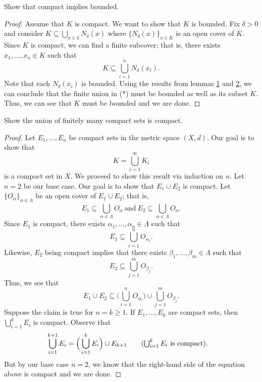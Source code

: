 \documentclass[a4paper]{article}
\begin{document}
   \begin{problem}
       Show that compact implies bounded.
   \end{problem}
   \begin{proof}
       Assume that \( K  \) is compact. We want to show that \( K  \) is bounded. Fix \( \delta > 0  \) and consider \( K \subseteq \bigcup_{ x \in k  }^{  } {N}_{\delta}(x) \) where \( \{ {N}_{\delta}(x) \}_{x \in K} \) is an open cover of \( K  \). Since \( K  \) is compact, we can find a finite subcover; that is, there exists \( {x}_{1}, \dots, {x}_{n} \in K     \) such that 
       \[ K \subseteq \bigcup_{ i=1  }^{ n } {N}_{\delta}({x}_{i}). \tag{*}  \]
       Note that each \( {N}_{\delta}({x}_{i}) \) is bounded. Using the results from lemmas {\hyperref[lemma 1]{1}} and {\hyperref[lemma 2]{2}}, we can conclude that the finite union in (*) must be bounded as well as its subset \( K  \). Thus, we can see that \( K  \) must be bounded and we are done.   
   \end{proof}



   \begin{problem}
      Show the union of finitely many compact sets is compact. 
   \end{problem}
\begin{proof}
    Let \( {E}_{1}, \dots, {E}_{n} \) be compact sets in the metric space \( (X,d) \). Our goal is to show that  
    \[  K = \bigcup_{ i=1  }^{ \infty   }  {K}_{i}  \]
    is a compact set in \( X \). We proceed to show this result via induction on \( n  \).
    Let \( n = 2  \) be our base case. Our goal is to show that \( {E}_{1} \cup {E}_{2} \) is compact. Let \( \{ {O}_{\alpha} \}_{\alpha \in \Lambda} \) be an open cover of \( {E}_{1} \cup {E}_{2} \); that is,
    \[  {E}_{1} \subseteq  \bigcup_{ \alpha \in \Lambda }^{  }  {O}_{\alpha} \ \text{and} \ {E}_{2} \subseteq  \bigcup_{ \alpha \in \Lambda }^{  }  {O}_{\alpha}. \]
    Since \( {E}_{1} \) is compact, there exists \( {\alpha}_{1}, \dots, {\alpha}_{n} \in \Lambda  \) such that 
    \[  {E}_{1} \subseteq  \bigcup_{ i=1  }^{ n }  {O}_{{\alpha}_{i}}. \]
    Likewise, \( {E}_{2} \) being compact implies that there exists \( {\beta}_{1}, \dots, {\beta}_{m} \in \Lambda \) such that  
    \[  {E}_{2} \subseteq  \bigcup_{ j=1  }^{ m  }  {O}_{{\beta}_{j}}. \]
    Thus, we see that 
    \[  {E}_{1} \cup {E}_{2} \subseteq \Big( \bigcup_{ i=1  }^{ n  } {O}_{{\alpha}_{i}} \Big) \cup \bigcup_{ j=1  }^{ m }  {O}_{{\beta}_{j}}.  \]
    Suppose the claim is true for \( n = k \geq 1  \). If \( {E}_{1}, \dots, {E}_{k} \) are compact sets, then \( \bigcup_{ i=1  }^{ k  }  {E}_{i} \) is compact. Observe that 
    \begin{align*}
        \bigcup_{ i=1  }^{ k + 1  } {E}_{i} &= \Big(  \bigcup_{ i=1  }^{ k  }  {E}_{i} \Big) \cup {E}_{k+1} \tag{\( \bigcup_{ i=1  }^{ k  } {E}_{i}  \) is compact}.
    \end{align*}
    But by our base case \( n = 2  \), we know that the right-hand side of the equation above is compact and we are done.
\end{proof}
\end{document}
